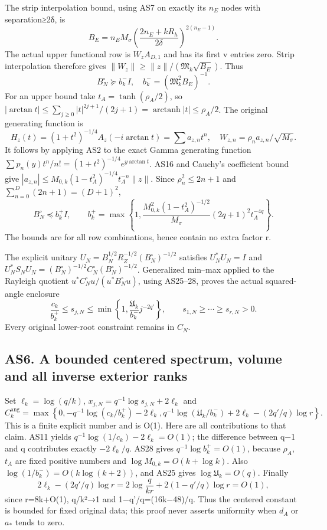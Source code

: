 \documentclass[11pt]{article}
\begin{document}
The strip interpolation bound, using AS7 on exactly its \(n_E\) nodes with separation≥2δ, is \[
B_E=n_EM_\sigma\left(\frac{2n_E+kR_h}{2\delta}\right)^{2(n_E-1)}.
\] The actual upper functional row is \(W_zA_{D,1}\) and has its first v entries zero. Strip interpolation therefore gives \(\|W_z\|\ge\|z\|/(\mathfrak M_k\sqrt{B_E})\). Thus \[
B_N^\circ\succeq b_k^-I,
\quad b_k^-=(\mathfrak M_k^2B_E)^{-1}.
\tag{AS26}
\] For an upper bound take \(t_A=\tanh(\rho_A/2)\), so \(|\arctan t|\le\sum_{j\ge0}|t|^{2j+1}/(2j+1)
=\operatorname{arctanh}|t|\le\rho_A/2\). The original generating function is \[
H_z(t)=(1+t^2)^{-1/4}A_z(-i\arctan t)=\sum a_{z,n}t^n,
\quad W_{z,n}=\rho_na_{z,n}/\sqrt{M_\sigma}.
\tag{AS27}
\] It follows by applying AS2 to the exact Gamma generating function \(\sum p_n(y)t^n/n!=(1+t^2)^{-1/4}e^{y\arctan t}\). AS16 and Cauchy's coefficient bound give \(|a_{z,n}|\le M_{0,k}(1-t_A^2)^{-1/4}t_A^{-n}\|z\|\). Since \(\rho_n^2\le2n+1\) and \(\sum_{n=0}^D(2n+1)=(D+1)^2\), \[
B_N^\circ\preceq b_k^+I,\qquad
b_k^+=\max\left\{1,
\frac{M_{0,k}^2(1-t_A^2)^{-1/2}}{M_\sigma}
(2q+1)^2t_A^{-4q}\right\}.
\tag{AS28}
\] The bounds are for all row combinations, hence contain no extra factor r.

The explicit unitary \(U_N=B_N^{1/2}R_Z^{-1/2}(B_N^\circ)^{-1/2}\) satisfies \(U_N^*U_N=I\) and \(U_N^*S_NU_N=(B_N^\circ)^{-1/2}C_N^\circ(B_N^\circ)^{-1/2}\). Generalized min--max applied to the Rayleigh quotient \(u^*C_N^\circ u/(u^*B_N^\circ u)\), using AS25--28, proves the actual squared-angle enclosure \[
\frac{c_k}{b_k^+}\le s_{j,N}\le
\min\left\{1,\frac{\mathfrak U_k}{b_k^-}j^{-2q'}\right\},
\qquad s_{1,N}\ge\cdots\ge s_{r,N}>0.
\tag{AS29}
\] Every original lower-root constraint remains in \(C_N\).

\subsection{AS6. A bounded centered spectrum, volume and all inverse exterior ranks}\label{as6.-a-bounded-centered-spectrum-volume-and-all-inverse-exterior-ranks}

Set \(\ell_k=\log(q/k)\), \(x_{j,N}=q^{-1}\log s_{j,N}+2\ell_k\) and \[
C_k^{\mathrm{ang}}=\max\left\{0,
-q^{-1}\log(c_k/b_k^+)-2\ell_k,
q^{-1}\log(\mathfrak U_k/b_k^-)+2\ell_k
-(2q'/q)\log r\right\}.
\tag{AS30}
\] This is a finite explicit number and is O(1). Here are all contributions to that claim. AS11 yields \(q^{-1}\log(1/c_k)-2\ell_k=O(1)\); the difference between q−1 and q contributes exactly \(-2\ell_k/q\). AS28 gives \(q^{-1}\log b_k^+=O(1)\), because \(\rho _A\),\(t_A\) are fixed positive numbers and \(\log M_{0,k}=O(k+\log k)\). Also \(\log(1/b_k^-)=O(k\log(k+2))\), and AS25 gives \(\log\mathfrak U_k=O(q)\). Finally \[
2\ell_k-(2q'/q)\log r
=2\log\frac{q}{kr}+2(1-q'/q)\log r=O(1),
\] since r=8k+O(1), q/k²→1 and 1−q'/q=(16k−48)/q. Thus the centered constant is bounded for fixed original data; this proof never asserts uniformity when \(d_A\) or \textbar{}\(a_*\)\textbar{} tends to zero.
\end{document}
